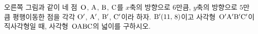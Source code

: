 \noindent\begin{minipage}[t]{0.58\linewidth}\vspace{0pt}\raggedright 오른쪽 그림과 같이 네 점~$\mathrm{O}$, $\mathrm{A}$, $\mathrm{B}$, $\mathrm{C}$를 $x$축의 방향으로 $6$만큼, $y$축의 방향으로 $5$만큼 평행이동한 점을 각각 $\mathrm{O}'$, $\mathrm{A}'$, $\mathrm{B}'$, $\mathrm{C}'$이라 하자. $\mathrm{B}'(11,\mkern3mu 8)$이고 사각형~$\mathrm{O}'\mathrm{A}'\mathrm{B}'\mathrm{C}'$이 직사각형일 때, 사각형~$\mathrm{OABC}$의 넓이를 구하시오.\end{minipage}\hfill\begin{minipage}[t]{0.4\linewidth}\vspace{0pt}\centering \resizebox{\ifdim\width>\linewidth\linewidth\else\width\fi}{!}{}\end{minipage}\par
